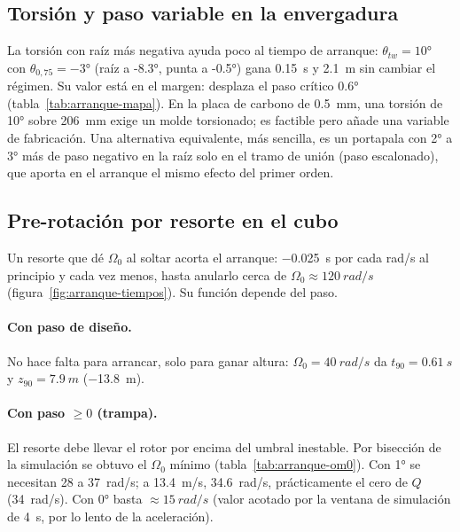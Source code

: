 \subsection{Torsión y paso variable en la envergadura}

La torsión con raíz más negativa ayuda poco al tiempo de arranque: $\theta_{tw}=\ang{+10}$
con $\theta_{0,75}=\ang{-3}$ (raíz a \ang{-8.3}, punta a \ang{-0.5}) gana \SI{0.15}{s} y
\SI{2.1}{m} sin cambiar el régimen. Su valor está en el margen: desplaza el paso crítico
\ang{0.6} (tabla~\ref{tab:arranque-mapa}). En la placa de carbono de \SI{0.5}{mm}, una
torsión de \ang{10} sobre \SI{206}{mm} exige un molde torsionado; es factible pero añade
una variable de fabricación. Una alternativa equivalente, más sencilla, es un portapala con
\ang{2} a \ang{3} más de paso negativo en la raíz solo en el tramo de unión (paso escalonado),
que aporta en el arranque el mismo efecto del primer orden.

\subsection{Pre-rotación por resorte en el cubo}

Un resorte que dé $\Omega_0$ al soltar acorta el arranque: \SI{-0.025}{s}
por cada rad/s al principio y cada vez menos, hasta anularlo cerca de $\Omega_0\approx\SI{120}{rad/s}$ (figura~\ref{fig:arranque-tiempos}).
Su función depende del paso.

\paragraph{Con paso de diseño.} No hace falta para arrancar, solo para ganar altura:
$\Omega_0=\SI{40}{rad/s}$ da $t_{90}=\SI{0.61}{s}$ y $z_{90}=\SI{7.9}{m}$ (\SI{-13.8}{m}).

\paragraph{Con paso $\ge0$ (trampa).} El resorte debe llevar el rotor por encima del umbral
inestable. Por bisección de la simulación se obtuvo el $\Omega_0$ mínimo
(tabla~\ref{tab:arranque-om0}). Con \ang{+1} se necesitan \num{28} a \SI{37}{rad/s}; a \SI{13.4}{m/s},
\SI{34.6}{rad/s}, prácticamente el cero de $Q$ (\SI{34}{rad/s}). Con \ang{0} basta $\approx\SI{15}{rad/s}$ (valor acotado por la ventana de simulación
de \SI{4}{s}, por lo lento de la aceleración).

